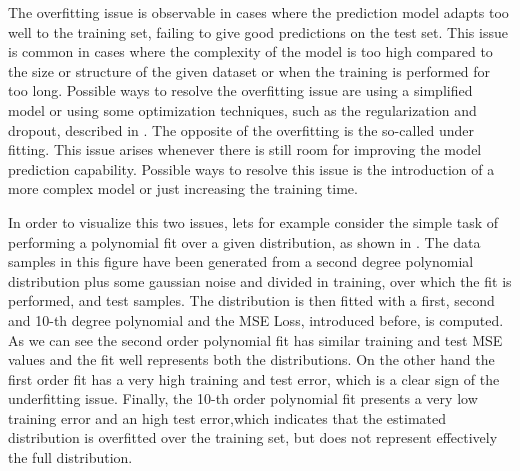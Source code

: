 The overfitting\cite{overfitting} issue is observable in cases where the prediction model adapts too well to the training set, failing to give good predictions on the test set. This issue is common in cases where the complexity of the model is too high compared to the size or structure of the given dataset or when the training is performed for too long. Possible ways to resolve the overfitting issue are using a simplified model or using some optimization techniques, such as the regularization and dropout, described in .
The opposite of the overfitting is the so-called under fitting. This issue arises whenever there is still room for improving the model prediction capability. Possible ways to resolve this issue is the introduction of a more complex model or just increasing the training time.

In order to visualize this two issues, lets for example consider the simple task of performing a polynomial fit over a given distribution, as shown in  . The data samples in this figure have been generated from a second degree polynomial distribution plus some gaussian noise and divided in training, over which the fit is performed, and test samples. The distribution is then fitted with a first, second and 10-th degree polynomial and the MSE Loss, introduced before, is computed. As we can see the second order polynomial fit has similar training and test MSE values and the fit well represents both the distributions. On the other hand the first order fit has a very high training and test error, which is a clear sign of the underfitting issue. Finally, the 10-th order polynomial fit presents a very low training error and an high test error,which indicates that the estimated distribution is overfitted over the training set, but does not represent effectively the full distribution.

